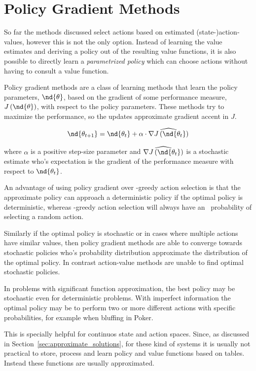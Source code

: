\section{Policy Gradient Methods}
So far the methods discussed select actions based on estimated (state-)action­ values, however this is not the only option. Instead of learning the value estimates and deriving a policy out of the resulting value functions, it is also possible to directly learn a \emph{parametrized policy} which can choose actions without having to consult a value function.

Policy gradient methods are a class of learning methods that learn the policy parameters, $\nd{\theta}$, based on the gradient of some performance measure, $J\left(\nd{\theta}\right)$, with respect to the policy parameters. These methods try to maximize the performance, so the updates approximate gradient accent in $J$. 

\begin{equation}
  \nd{\theta_{t+1}} = \nd{\theta_t} + \alpha \cdot \widehat{\nabla J\left(\nd{\theta_t}\right)}
  \label{eq:stochastic_gradient_ascent}
\end{equation}

where $\alpha$ is a positive step-size parameter and $\widehat{\nabla J\left(\nd{\theta_t}\right)}$ is a stochastic estimate who's expectation is the gradient of the performance measure with respect to $\nd{\theta_t}$.

An advantage of using policy gradient over \eps-greedy action selection is that the approximate policy can approach a deterministic policy if the optimal policy is deterministic, whereas \eps-greedy action selection will always have an \eps \ probability of selecting a random action.

Similarly if the optimal policy is stochastic or in cases where multiple actions have similar values, then policy gradient methods are able to converge towards stochastic policies who's probability distribution approximate the distribution of the optimal policy. In contrast action-value methods are unable to find optimal stochastic policies.

In problems with significant function approximation, the best policy may be stochastic even for deterministic problems. With imperfect information the optimal policy may be to perform two or more different actions with specific probabilities, for example when bluffing in Poker.

This is specially helpful for continuos state and action spaces. Since, as discussed in Section~\ref{sec:approximate_solutions}, for these kind of systems it is usually not practical to store, process and learn policy and value functions based on tables. Instead these functions are usually approximated.
 
